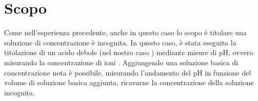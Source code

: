 \section*{Scopo}

Come nell'esperienza precedente, anche in questo caso lo scopo è titolare una
soluzione di concentrazione è incognita.
In questo caso, è stata eseguita la titolazione di un acido debole (nel nostro caso ) mediante misure di pH, ovvero misurando la concentrazione di ioni .
Aggiungendo una soluzione basica di concentrazione nota è possibile, misurando l'andamento del pH in funzione del volume di soluzione basica aggiunta, ricavarne la concentrazione della soluzione incognita.
